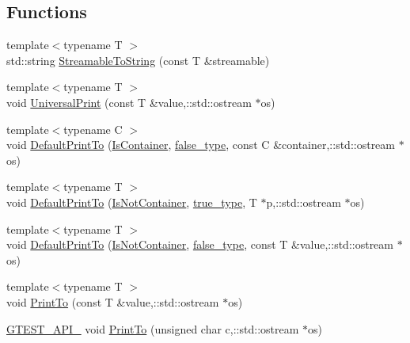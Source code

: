 \subsection*{Functions}
\begin{DoxyCompactItemize}
\item 
{\footnotesize template$<$typename T $>$ }\\std\+::string \hyperlink{namespacetesting_1_1internal_aad4beed95d0846e6ffc5da0978ef3bb9}{Streamable\+To\+String} (const T \&streamable)
\item 
{\footnotesize template$<$typename T $>$ }\\void \hyperlink{namespacetesting_1_1internal_ad121a890bddf866e59605d1a0198dada}{Universal\+Print} (const T \&value,\+::std\+::ostream $\ast$os)
\item 
{\footnotesize template$<$typename C $>$ }\\void \hyperlink{namespacetesting_1_1internal_a729016f07085b1cfb44d21331f791141}{Default\+Print\+To} (\hyperlink{namespacetesting_1_1internal_ad8f0c2883245f1df2a53618a49f0deb3}{Is\+Container}, \hyperlink{namespacetesting_1_1internal_abb1d0789f19bdde21affccbd1078b525}{false\+\_\+type}, const C \&container,\+::std\+::ostream $\ast$os)
\item 
{\footnotesize template$<$typename T $>$ }\\void \hyperlink{namespacetesting_1_1internal_aa8dafaf55c18333baa5fdb858e69be96}{Default\+Print\+To} (\hyperlink{namespacetesting_1_1internal_abf080521ce135deb510e0a7830fd3d33}{Is\+Not\+Container}, \hyperlink{namespacetesting_1_1internal_a62f917c3424d8841de9b49b5ec28edb4}{true\+\_\+type}, T $\ast$p,\+::std\+::ostream $\ast$os)
\item 
{\footnotesize template$<$typename T $>$ }\\void \hyperlink{namespacetesting_1_1internal_a29e705ab252af57e825a086bb49c4831}{Default\+Print\+To} (\hyperlink{namespacetesting_1_1internal_abf080521ce135deb510e0a7830fd3d33}{Is\+Not\+Container}, \hyperlink{namespacetesting_1_1internal_abb1d0789f19bdde21affccbd1078b525}{false\+\_\+type}, const T \&value,\+::std\+::ostream $\ast$os)
\item 
{\footnotesize template$<$typename T $>$ }\\void \hyperlink{namespacetesting_1_1internal_a46859938b459a1581ec760755bc81fc7}{Print\+To} (const T \&value,\+::std\+::ostream $\ast$os)
\item 
\hyperlink{gtest-port_8h_aa73be6f0ba4a7456180a94904ce17790}{G\+T\+E\+S\+T\+\_\+\+A\+P\+I\+\_\+} void \hyperlink{namespacetesting_1_1internal_abae1a8d465376b68576918205ad706a9}{Print\+To} (unsigned char c,\+::std\+::ostream $\ast$os)

\end{DoxyCompactItemize}
